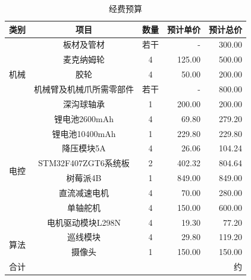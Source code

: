 \documentclass[10pt]{ctexart}
\begin{document}
\begin{table}[H]
    \centering
    \caption{经费预算}
    \begin{tabular}{cccrr}
        \toprule
        类别                  & 项目               & 数量 & 预计单价   & 预计总价              \\
        \midrule
        \multirow{5}{*}{机械} & 板材及管材            & 若干 & -      & 300.00            \\
                            & 麦克纳姆轮            & 4  & 125.00 & 500.00            \\
                            & 胶轮               & 4  & 50.00  & 200.00            \\
                            & 机械臂及机械爪所需零部件     & 若干 & -      & 800.00            \\
                            & 深沟球轴承            & 1  & 200.00 & 200.00            \\
        \hline
        \multirow{8}{*}{电控} & 锂电池2600mAh       & 4  & 69.80  & 279.20            \\
                            & 锂电池10400mAh      & 1  & 229.80 & 229.80            \\
                            & 降压模块5A           & 4  & 26.06  & 104.24            \\
                            & STM32F407ZGT6系统板 & 2  & 402.32 & 804.64            \\
                            & 树莓派4B            & 1  & 849.00 & 849.00            \\
                            & 直流减速电机           & 4  & 70.00  & 280.00            \\
                            & 单轴舵机             & 4  & 150.00 & 600.00            \\
                            & 电机驱动模块L298N      & 4  & 19.30  & 77.20             \\
        \hline
        \multirow{2}{*}{算法} & 巡线模块             & 4  & 29.80  & 119.20            \\
                            & 摄像头              & 1  & 150.00 & 150.00            \\
        \hline
        合计                  &                  &    &        & 约\textyen 5500.00 \\
        \bottomrule
    \end{tabular}
    \label{tab:budget}
\end{table}
\end{document}
